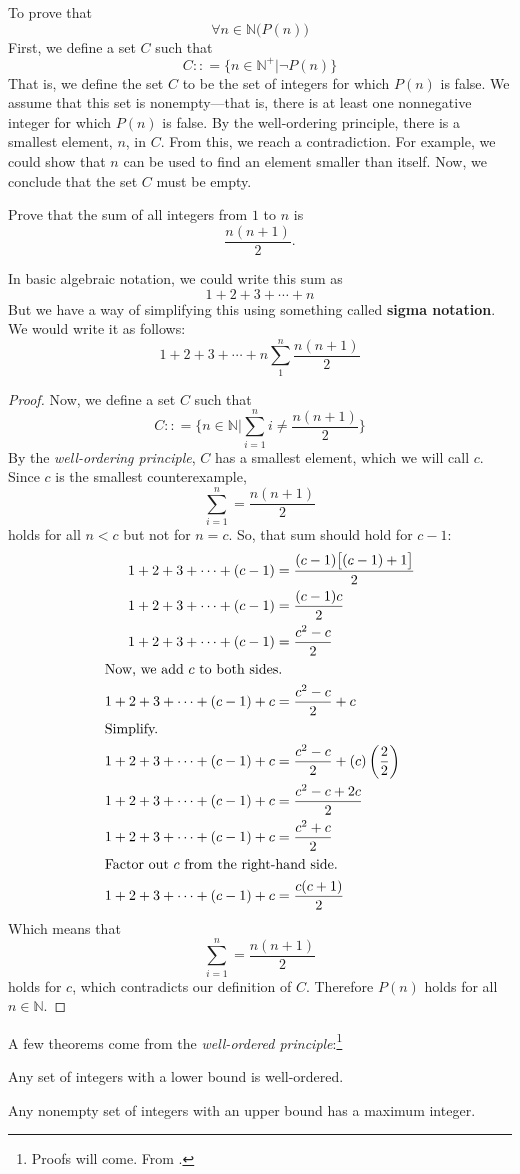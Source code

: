 To prove that
\[ \forall n \in \mathbb N \big( P(n)\big) \]
First, we define a set $C$ such that
\[ C : : = \big\{ n \in \mathbb N^+ \big| \neg P(n) \big\} \]
That is, we define the set $C$ to be the set of integers for which $P(n)$ is false.
We assume that this set is nonempty---that is, there is at least one nonnegative integer for which $P(n)$ is false.
By the well-ordering principle, there is a smallest element, $n$, in $C$.
From this, we reach a contradiction.
For example, we could show that $n$ can be used to find an element smaller than itself.
Now, we conclude that the set $C$ must be empty.

\begin{ex}
  Prove that the sum of all integers from $1$ to $n$ is \[\frac{n(n+1)}{2}.\]

  In basic algebraic notation, we could write this sum as
  \[1 + 2 + 3 + \cdots + n \]
  But we have a way of simplifying this using something called \textbf{sigma notation}.
  We would write it as follows:
  \[1+2+3+\cdots+n  \sum_{1}^n \frac{n(n+1)}{2} \]
  \begin{proof}
    Now, we define a set $C$ such that
    \[ C : : = \bigg\{ n \in \mathbb N \big| \sum_{i=1}^n i \neq \frac{n(n+1)}{2}\bigg\}\]
    By the \emph{well-ordering principle}, $C$ has a smallest element, which we will call $c$.
    Since $c$ is the smallest counterexample,
    \[\sum_{i=1}^n = \frac{n(n+1)}{2}\]
    holds for all $n<c$ but not for $n=c$. So, that sum should hold for $c-1$:
    \begin{align*}
      1+2+3+\cdots+(c-1)&=\frac{(c-1)\big[(c-1)+1\big]}{2}\\
      1+2+3+\cdots+(c-1)&=\frac{(c-1)c}{2}\\
      1+2+3+\cdots+(c-1)&=\frac{c^2-c}{2}\\
      \intertext{Now, we add $c$ to both sides.}
      1+2+3+\cdots+(c-1)+c&=\frac{c^2-c}{2}+c\\
      \intertext{Simplify.}
      1+2+3+\cdots+(c-1)+c&=\frac{c^2-c}{2}+(c)\left(\frac{2}{2}\right)\\
      1+2+3+\cdots+(c-1)+c&=\frac{c^2-c+2c}{2} \\
      1+2+3+\cdots+(c-1)+c&=\frac{c^2+c}{2} \\
      \intertext{Factor out $c$ from the right-hand side.}
      1+2+3+\cdots+(c-1)+c&=\frac{c(c+1)}{2} \\
    \end{align*}
    Which means that
    \[\sum_{i=1}^n = \frac{n(n+1)}{2}\]
    holds for $c$, which contradicts our definition of $C$. Therefore $P(n)$ holds for all  $n \in \mathbb N$.
  \end{proof}
\cite{mcsfull}
\end{ex}

A few theorems come from the \emph{well-ordered principle}:\footnote{Proofs will come. From \cite[29]{mcsfull}.}
\begin{theorem}
  Any set of integers with a lower bound is well-ordered.
\end{theorem}
\begin{theorem}
  Any nonempty set of integers with an upper bound has a maximum integer.
\end{theorem}
